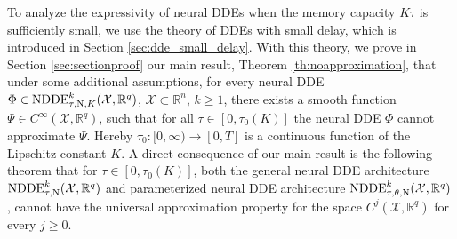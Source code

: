\documentclass[10pt]{article}
\numberwithin{equation}{section}
\begin{document}
	To analyze the expressivity of neural DDEs when the memory capacity $K\tau$ is sufficiently small, we use the theory of DDEs with small delay, which is introduced in Section \ref{sec:dde_small_delay}. With this theory, we prove in Section \ref{sec:sectionproof} our main result, Theorem \ref{th:noapproximation}, that under some additional assumptions, for every  neural DDE $\Phi \in \textup{NDDE}_{\tau,\textup{N},K}^k(\mathcal{X},\mathbb{R}^q)$, $\mathcal{X}\subset \mathbb{R}^n$, $k \geq 1$, there exists a smooth function $\Psi \in C^\infty(\mathcal{X},\mathbb{R}^q)$, such that for all $\tau \in[0,\tau_0(K)]$ the neural DDE $\Phi$ cannot approximate $\Psi$. Hereby $\tau_0: [0,\infty)\rightarrow [0,T]$ is a continuous function of the Lipschitz constant $K$. A direct consequence of our main result is the following theorem that for $\tau \in[0,\tau_0(K)]$, both the general neural DDE architecture $\textup{NDDE}_{\tau,\textup{N}}^k(\mathcal{X},\mathbb{R}^q)$ and parameterized neural DDE architecture $\textup{NDDE}_{\tau,\theta,\textup{N}}^k(\mathcal{X},\mathbb{R}^q)$, cannot have the universal approximation property for the space $C^j(\mathcal{X},\mathbb{R}^q)$ for every $j\geq 0$. 
	
\end{document}
